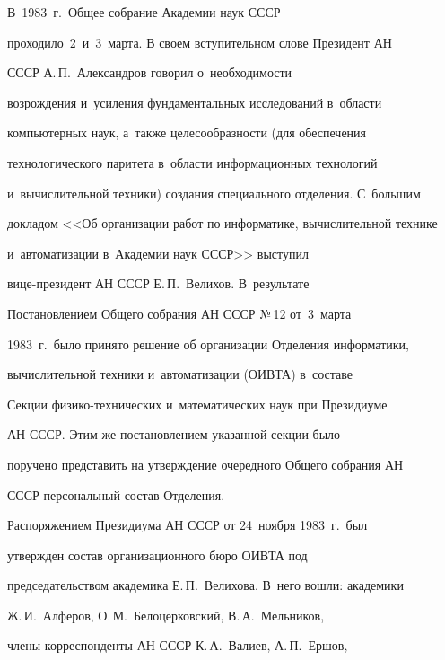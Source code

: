    

  В~1983~г.\  Общее собрание Академии наук \mbox{СССР} 

проходило~2~и~3~мар\-та. В своем вступительном слове Президент АН 

\mbox{СССР} А.\,П.~Александров говорил о~не\-об\-хо\-ди\-мости 

воз\-рож\-де\-ния и~усиления фундаментальных исследований в~об\-ласти 

компьютерных наук, а~так\-же це\-ле\-со\-образ\-ности (для обеспечения 

технологического паритета в~об\-ласти информационных технологий 

и~вы\-чис\-ли\-тель\-ной техники) создания специального отделения. С~большим 

докладом <<Об организации работ по информатике, вы\-чис\-ли\-тель\-ной технике 

и~автоматизации в~Академии наук \mbox{СССР}>> вы\-сту\-пил 

ви\-це-пре\-зи\-дент АН \mbox{СССР} Е.\,П.~Велихов. В~результате 

По\-ста\-нов\-ле\-ни\-ем Общего собрания АН \mbox{СССР} №\,12 от~3~марта 

1983~г.\ было принято решение об организации Отделения информатики, 

вы\-чис\-ли\-тель\-ной техники и~автоматизации (\mbox{ОИВТА}) в~со\-ста\-ве 

Секции фи\-зи\-ко-тех\-ни\-че\-ских и~математических наук при Президиуме 

АН \mbox{СССР}. Этим же по\-ста\-нов\-ле\-ни\-ем указанной секции было 

поручено представить на утверж\-де\-ние очередного Общего собрания АН 

\mbox{СССР} персональный со\-став Отделения.

{



}

   

   Распоряжением Президиума АН \mbox{СССР} от 24~ноября 1983~г.\ был 

утверж\-ден со\-став организационного бюро \mbox{ОИВТА} под 

председательством академика Е.\,П.~Велихова. В~него во\-шли: академики 

Ж.\,И.~Алферов, О.\,М.~Белоцерковский, В.\,А.~Мельников, 

чле\-ны-кор\-рес\-пон\-ден\-ты АН \mbox{СССР} К.\,А.~Валиев, А.\,П.~Ершов, 

